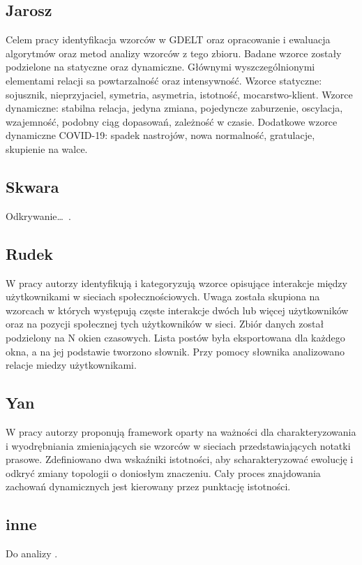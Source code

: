 \subsection{Jarosz}\label{subsec:jarosz}
Celem pracy \cite{Jarosz2020} identyfikacja wzorców w GDELT oraz opracowanie i ewaluacja algorytmów oraz metod analizy wzorców z tego zbioru\@.
Badane wzorce zostały podzielone na statyczne oraz dynamiczne.
Głównymi wyszczególnionymi elementami relacji sa powtarzalność oraz intensywność.
Wzorce statyczne: sojusznik, nieprzyjaciel, symetria, asymetria, istotność, mocarstwo-klient.
Wzorce dynamiczne: stabilna relacja, jedyna zmiana, pojedyncze zaburzenie, oscylacja, wzajemność, podobny ciąg dopasowań, zależność w czasie.
Dodatkowe wzorce dynamiczne COVID-19: spadek nastrojów, nowa normalność, gratulacje, skupienie na walce.

\subsection{Skwara}\label{subsec:skwara}
Odkrywanie\ldots~\cite{Skwara2019}.

\subsection{Rudek}\label{subsec:rudek}
W pracy \cite{10.1093/jigpal/jzaa042} autorzy identyfikują i kategoryzują wzorce opisujące interakcje między użytkownikami w sieciach społecznościowych.
Uwaga została skupiona na wzorcach w których występują częste interakcje dwóch lub więcej użytkowników oraz na pozycji społecznej tych użytkowników w sieci.
Zbiór danych został podzielony na N okien czasowych.
Lista postów była eksportowana dla każdego okna, a na jej podstawie tworzono słownik.
Przy pomocy słownika analizowano relacje miedzy użytkownikami.

\subsection{Yan}\label{subsec:yan}
W pracy \cite{Yan2012} autorzy proponują framework oparty na ważności dla charakteryzowania i wyodrębniania zmieniających sie wzorców w sieciach przedstawiających notatki prasowe.
Zdefiniowano dwa wskaźniki istotności, aby scharakteryzować ewolucję i odkryć zmiany topologii o doniosłym znaczeniu.
Cały proces znajdowania zachowań dynamicznych jest kierowany przez punktację istotności.

\subsection{inne}\label{subsec:inne}
Do analizy \cite{Buckingham2020,Levin2018,Yuan2017}.